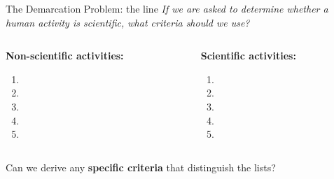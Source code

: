 \documentclass{beamer}
\begin{document}
\begin{frame}{The Demarcation Problem: the line}
\textit{If we are asked to determine whether a human activity is scientific, what criteria should we use?} \\ \vspace{0.5cm}
\begin{columns}[T]
\begin{column}{0.5\textwidth}
\textbf{Non-scientific activities:}
\begin{enumerate}
\item 
\item 
\item 
\item 
\item 
\end{enumerate}
\end{column}
\begin{column}{0.5\textwidth}
\textbf{Scientific activities:}
\begin{enumerate}
\item 
\item 
\item 
\item 
\item 
\end{enumerate}
\end{column}
\end{columns} \vspace{0.5cm}
Can we derive any \textbf{\alert{specific criteria}} that distinguish the lists?
\end{frame}
\end{document}
